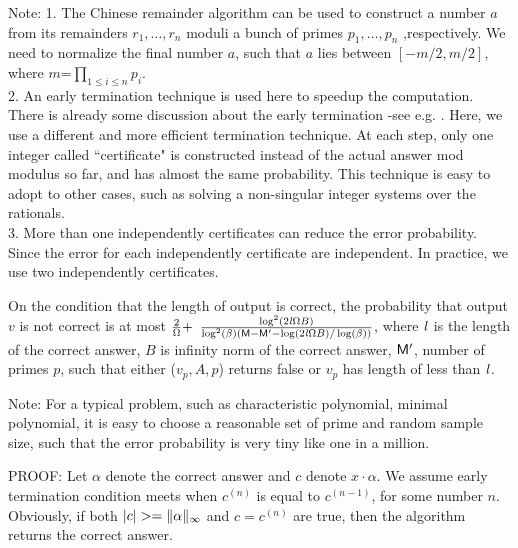 Note:
1. The Chinese remainder algorithm can be used to construct a number $a$ from
its remainders $r_1, \ldots, r_n$ moduli a bunch of primes $p_1, \ldots, p_n$
,respectively. We need to normalize the final number $a$, 
such that $a$ lies between $[-m/2, m/2]$, 
where $m$=$\prod_{1\leq i \leq n} p_i$.\\
2. An early termination technique is used here to speedup the computation.
There is already some discussion about the early termination 
-see e.g. \cite{Emiris98}.
Here, we use a different and more efficient termination technique.
At each step, only one integer called ``certificate" is constructed 
instead of the actual answer mod modulus so far, and has almost
the same probability. This technique is easy to adopt to other cases,
such as solving a non-singular integer systems over the rationals.\\
3. More than one independently certificates can reduce the error probability.
Since the error for each independently certificate are independent.
In practice, we use two independently certificates.
\begin{theorem}
On the condition that the length of output is correct,
the probability that output $v$ is not correct
is at most
$\frac{2}{\Omega} +$
$\frac{\log^2(2\mathit l \Omega B)}
{\log^2(\beta) (\mathsf M - \mathsf M^\prime - \log(2\mathit l \Omega B) / \log(\beta))}$,
where $\mathit l$ is the length of the correct answer,
$B$ is infinity norm of the correct answer,
$\mathsf M^\prime$, number of primes $p$, 
such that either \reveal($v_p, A, p$) returns false
or $v_p$ has length of less than $\mathit l$.
\end{theorem}

Note: For a typical problem, such as characteristic polynomial, 
minimal polynomial, it is easy to choose a reasonable set of prime 
and random sample size,
such that the error probability is very tiny like one in a million.

PROOF:
Let $\alpha$ denote the correct answer and
$c$ denote $x \cdot \alpha$. We assume early termination condition meets when 
$c^{(n)}$ is equal to $c^{(n-1)}$, for some number $n$. 
Obviously, if both $|c| >= \|\alpha\|_\infty$ and
$c = c^{(n)}$ are true, then the algorithm returns the correct answer.

